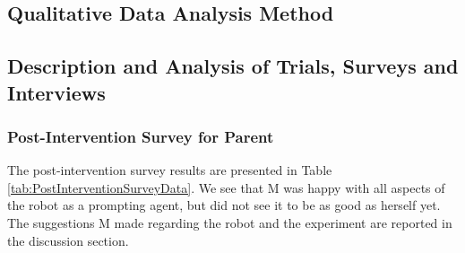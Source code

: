 \subsection{Qualitative Data Analysis Method}

\subsection{Description and Analysis of Trials, Surveys and Interviews}


\subsubsection{Post-Intervention Survey for Parent}
The post-intervention survey results are presented in Table \ref{tab:PostInterventionSurveyData}.  We see that M was happy with all aspects of the robot as a prompting agent, but did not see it to be as good as herself yet.  The suggestions M made regarding the robot and the experiment are reported in the discussion section.

